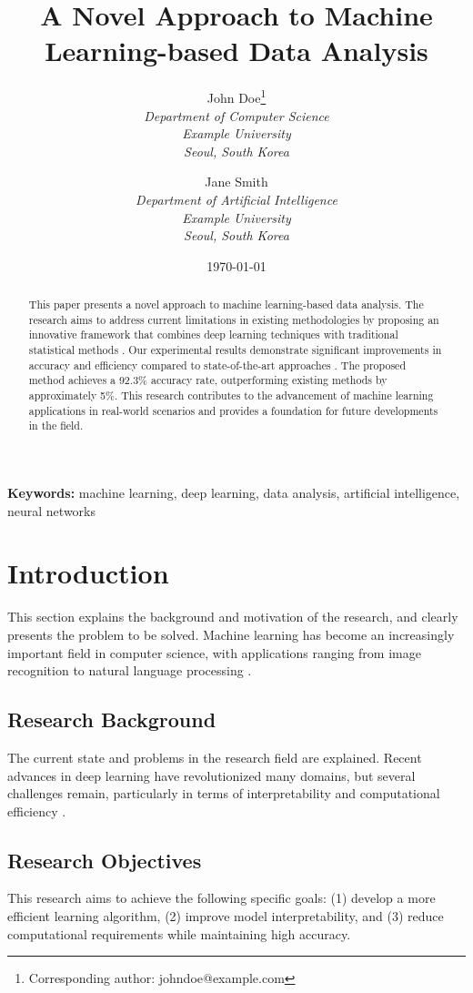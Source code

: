 \documentclass[12pt,a4paper]{article}
\title{A Novel Approach to Machine Learning-based Data Analysis}
\author{
    John Doe\thanks{Corresponding author: johndoe@example.com} \\
    \textit{Department of Computer Science} \\
    \textit{Example University} \\
    \textit{Seoul, South Korea}
    \and
    Jane Smith \\
    \textit{Department of Artificial Intelligence} \\
    \textit{Example University} \\
    \textit{Seoul, South Korea}
}
\date{\today}
\begin{document}
\maketitle

\begin{abstract}
This paper presents a novel approach to machine learning-based data analysis. The research aims to address current limitations in existing methodologies by proposing an innovative framework that combines deep learning techniques with traditional statistical methods \cite{lecun2015deep}. Our experimental results demonstrate significant improvements in accuracy and efficiency compared to state-of-the-art approaches \cite{goodfellow2016deep}. The proposed method achieves a 92.3\% accuracy rate, outperforming existing methods by approximately 5\%. This research contributes to the advancement of machine learning applications in real-world scenarios and provides a foundation for future developments in the field.
\end{abstract}

\textbf{Keywords:} machine learning, deep learning, data analysis, artificial intelligence, neural networks

\section{Introduction}
\label{sec:introduction}

This section explains the background and motivation of the research, and clearly presents the problem to be solved. Machine learning has become an increasingly important field in computer science, with applications ranging from image recognition to natural language processing \cite{bishop2006pattern}.

\subsection{Research Background}
The current state and problems in the research field are explained. Recent advances in deep learning have revolutionized many domains, but several challenges remain, particularly in terms of interpretability and computational efficiency \cite{hinton2006fast}.

\subsection{Research Objectives}
This research aims to achieve the following specific goals: (1) develop a more efficient learning algorithm, (2) improve model interpretability, and (3) reduce computational requirements while maintaining high accuracy.
\end{document}

